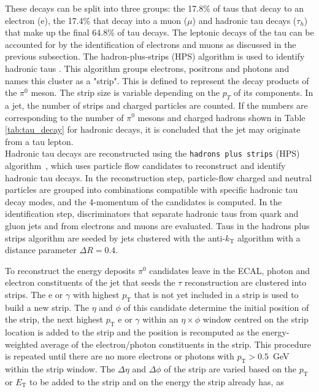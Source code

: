 These decays can be split into three groups: the 17.8\% of taus that decay to an electron (e), the 17.4\% that decay into a muon (\(\mu\)) and hadronic tau decays (\(\tau_h\)) that make up the final 64.8\% of tau decays. The leptonic decays of the tau can be accounted for by the identification of electrons and muons as discussed in the previous subsection. The hadron-plus-strips (HPS) algorithm is used to identify hadronic taus \cite{CMS_hps1,CMS_hps2}. This algorithm groups electrons, positrons and photons and names this cluster as a "strip". This is defined to represent the decay products of the \(\pi^0\) meson. The strip size is variable depending on the \(p_T\) of its components. In a jet, the number of strips and charged particles are counted. If the numbers are corresponding to the number of \(\pi^0\) mesons and charged hadrons shown in Table \ref{tab:tau_decay} for hadronic decays, it is concluded that the jet may originate from a tau lepton. \\

Hadronic tau decays are reconstructed using the \texttt{hadrons plus strips} (HPS) algorithm~\cite{Tau14001,Sirunyan:2018pgf}, which uses particle flow candidates to reconstruct and identify hadronic tau decays.
In the reconstruction step, particle-flow charged and neutral particles are grouped into combinations compatible with specific hadronic tau decay modes, and the 4-momentum
of the candidates is computed. In the identification step, discriminators that separate hadronic taus from quark and gluon jets and from electrons and muons are evaluated. 
Taus in the hadrons plus strips algorithm are seeded by jets clustered with the anti-$k_{\text{T}}$ algorithm with a distance parameter $\Delta R = 0.4$. 

To reconstruct the energy deposits $\pi^0$ candidates leave in the ECAL, photon and electron constituents of the jet that seeds the $\tau$ reconstruction are clustered into strips.
The e or $\gamma$ with highest $p_{\text{T}}$ that is not yet included in a strip is used to build a new strip. 
The $\eta$ and $\phi$ of this candidate determine the initial position of the strip, the next highest $p_{\text{T}}$ e or $\gamma$  within an $\eta \times \phi$ window centred on the strip location is added to the strip and the position is recomputed as the energy-weighted average of the electron/photon constituents in the strip.
This procedure is repeated until there are no more electrons or photons with $p_{\text{T}} > 0.5$~GeV  within the strip window. The $\Delta \eta$ and $\Delta \phi$ of the strip are varied based on the $p_{\text{T}}$ or $E_{\text{T}}$ to be added to the strip and on the energy the strip already has, as

